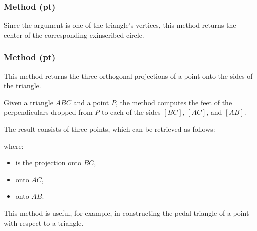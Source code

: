 \subsubsection{Method (pt)}
\label{ssub:method_triangle_excenter_pt}
Since the argument is one of the triangle's vertices, this method returns the center of the corresponding exinscribed circle.

\subsubsection{Method (pt)}
\label{ssub:method_triangle_projections_pt}

This method returns the three orthogonal projections of a point onto the sides of the triangle.

\medskip

Given a triangle $ABC$ and a point $P$, the method computes the feet of the perpendiculars dropped from $P$ to each of the sides $[BC]$, $[AC]$, and $[AB]$.

\medskip

The result consists of three points, which can be retrieved as follows:
\begin{mybox}
\end{mybox}
where:
\begin{itemize}
  \item {} is the projection onto $BC$,
  \item {} onto $AC$,
  \item {} onto $AB$.
\end{itemize}

\medskip

This method is useful, for example, in constructing the pedal triangle of a point with respect to a triangle.

\vspace{1em}


\begin{tkzexample}[latex = 7cm]
  \begin{center}
    \end{center}
\end{tkzexample}


